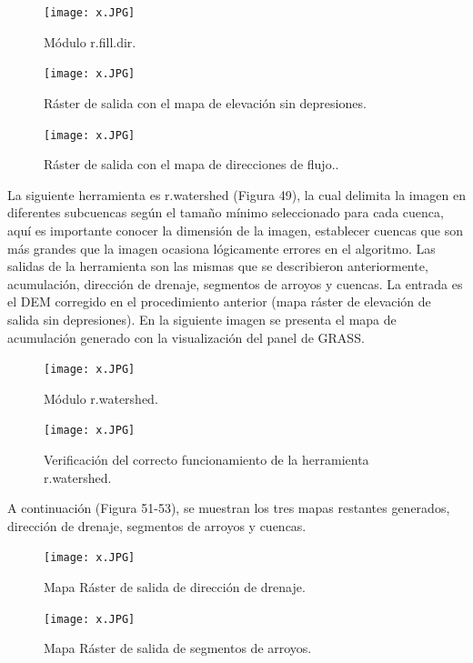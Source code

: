 \documentclass[12pt,hidelinks]{article}
\begin{document}
\begin{figure}[H]
    \centering
    \texttt{[image: x.JPG]}
    \caption{   Módulo r.fill.dir.} 
 \label{fig:my_label}
\end{figure}
\begin{figure}[H]
    \centering
    \texttt{[image: x.JPG]}
    \caption{   Ráster de salida con el mapa de elevación sin depresiones.} 
 \label{fig:my_label}
\end{figure}
\begin{figure}[H]
    \centering
    \texttt{[image: x.JPG]}
    \caption{   Ráster de salida con el mapa de direcciones de flujo..} 
 \label{fig:my_label}
\end{figure}
La siguiente herramienta es r.watershed (Figura 49), la cual delimita la imagen en diferentes subcuencas según el tamaño mínimo seleccionado para cada cuenca, aquí es importante conocer la dimensión de la imagen, establecer cuencas que son más grandes que la imagen ocasiona lógicamente errores en el algoritmo. Las salidas de la herramienta son las mismas que se describieron anteriormente, acumulación, dirección de drenaje, segmentos de arroyos y cuencas. La entrada es el DEM corregido en el procedimiento anterior (mapa ráster de elevación de salida sin depresiones). En la siguiente imagen se presenta el mapa de acumulación generado con la visualización del panel de GRASS.
\begin{figure}[H]
    \centering
    \texttt{[image: x.JPG]}
    \caption{   Módulo r.watershed.}
 \label{fig:my_label}
\end{figure}

\begin{figure}[H]
    \centering
    \texttt{[image: x.JPG]}
    \caption{   Verificación del correcto funcionamiento de la herramienta r.watershed.}
 \label{fig:my_label}
\end{figure}
A continuación (Figura 51-53), se muestran los tres mapas restantes generados, dirección
de drenaje, segmentos de arroyos y cuencas.
\begin{figure}[H]
    \centering
    \texttt{[image: x.JPG]}
    \caption{   Mapa Ráster de salida de dirección de drenaje.}
 \label{fig:my_label}
\end{figure}
\begin{figure}[H]
    \centering
    \texttt{[image: x.JPG]}
    \caption{   Mapa Ráster de salida de segmentos de arroyos.}
 \label{fig:my_label}
\end{figure}
\end{document}
